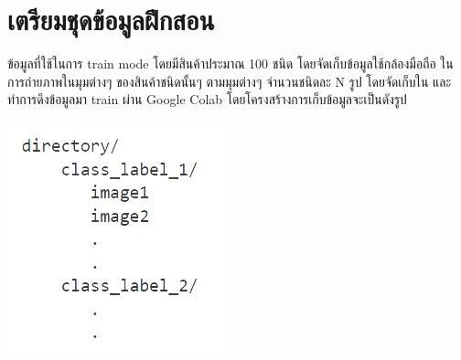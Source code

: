 \section{เตรียมชุดข้อมูลฝึกสอน}
ข้อมูลที่ใช้ในการ train mode โดยมีสินค้าประมาณ 100 ชนิด โดยจัดเก็บข้อมูลใช้กล้องมือถือ ในการถ่ายภาพในมุมต่างๆ
ของสินค้าชนิดนั้นๆ ตามมุมต่างๆ จำนวนชนิดละ N รูป โดยจัดเก็บใน  และทำการดึงข้อมูลมา train ผ่าน Google Colab
 โดยโครงสร้างการเก็บข้อมูลจะเป็นดังรูป

\begin{center}
  \includegraphics[scale=0.35]{pic/st.png}
\end{center}

